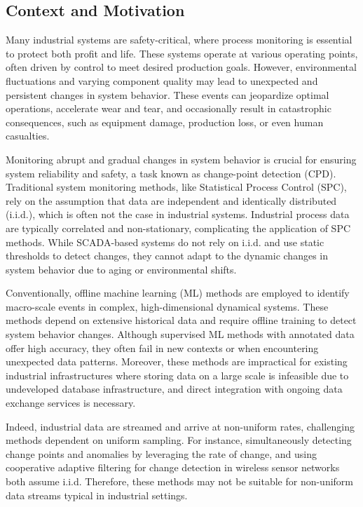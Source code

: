 \subsection{Context and Motivation}
Many industrial systems are safety-critical, where process monitoring is essential to protect both profit and life. These systems operate at various operating points, often driven by control to meet desired production goals. However, environmental fluctuations and varying component quality may lead to unexpected and persistent changes in system behavior. These events can jeopardize optimal operations, accelerate wear and tear, and occasionally result in catastrophic consequences, such as equipment damage, production loss, or even human casualties.

Monitoring abrupt and gradual changes in system behavior is crucial for ensuring system reliability and safety, a task known as change-point detection (CPD). Traditional system monitoring methods, like Statistical Process Control (SPC), rely on the assumption that data are independent and identically distributed (i.i.d.), which is often not the case in industrial systems. Industrial process data are typically correlated and non-stationary, complicating the application of SPC methods. While SCADA-based systems do not rely on i.i.d. and use static thresholds to detect changes, they cannot adapt to the dynamic changes in system behavior due to aging or environmental shifts.

Conventionally, offline machine learning (ML) methods are employed to identify macro-scale events in complex, high-dimensional dynamical systems. These methods depend on extensive historical data and require offline training to detect system behavior changes. Although supervised ML methods with annotated data offer high accuracy, they often fail in new contexts or when encountering unexpected data patterns. Moreover, these methods are impractical for existing industrial infrastructures where storing data on a large scale is infeasible due to undeveloped database infrastructure, and direct integration with ongoing data exchange services is necessary.

Indeed, industrial data are streamed and arrive at non-uniform rates, challenging methods dependent on uniform sampling. For instance, \citet{Liu2023} simultaneously detecting change points and anomalies by leveraging the rate of change, and \citet{Fathy2019} using cooperative adaptive filtering for change detection in wireless sensor networks both assume i.i.d. Therefore, these methods may not be suitable for non-uniform data streams typical in industrial settings.

